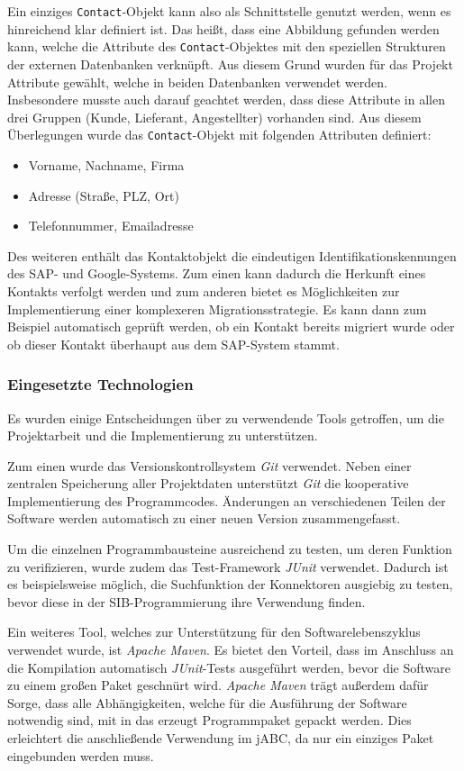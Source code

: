 Ein einziges \lstinline{Contact}-Objekt kann also als Schnittstelle genutzt werden, wenn es hinreichend klar definiert ist.
Das heißt, dass eine Abbildung gefunden werden kann, welche die Attribute des \lstinline{Contact}-Objektes mit den speziellen
 Strukturen der externen Datenbanken verknüpft.
Aus diesem Grund wurden für das Projekt Attribute gewählt, welche in beiden Datenbanken verwendet werden.
Insbesondere musste auch darauf geachtet werden, dass diese Attribute in allen drei Gruppen (Kunde, Lieferant,
 Angestellter) vorhanden sind.
Aus diesem Überlegungen wurde das \lstinline{Contact}-Objekt mit folgenden Attributen definiert:
\begin{itemize}
	\item Vorname, Nachname, Firma
	\item Adresse (Straße, PLZ, Ort)
	\item Telefonnummer, Emailadresse
\end{itemize}
Des weiteren enthält das Kontaktobjekt die eindeutigen Identifikationskennungen des SAP- und Google-Systems.
Zum einen kann dadurch die Herkunft eines Kontakts verfolgt werden und zum anderen bietet es Möglichkeiten
 zur Implementierung einer komplexeren Migrationsstrategie.
Es kann dann zum Beispiel automatisch geprüft werden, ob ein Kontakt bereits migriert wurde oder ob dieser
 Kontakt überhaupt aus dem SAP-System stammt.
	
\subsubsection{Eingesetzte Technologien}
Es wurden einige Entscheidungen über zu verwendende Tools getroffen, um die Projektarbeit und die
 Implementierung zu unterstützen.
 
Zum einen wurde das Versionskontrollsystem \emph{Git} verwendet.
Neben einer zentralen Speicherung aller Projektdaten unterstützt \emph{Git} die kooperative Implementierung des Programmcodes.
Änderungen an verschiedenen Teilen der Software werden automatisch zu einer neuen Version zusammengefasst.

Um die einzelnen Programmbausteine ausreichend zu testen, um deren Funktion zu verifizieren, wurde zudem das
 Test-Framework \emph{JUnit} verwendet. Dadurch ist es beispielsweise möglich, die Suchfunktion der Konnektoren ausgiebig
 zu testen, bevor diese in der SIB-Programmierung ihre Verwendung finden.

Ein weiteres Tool, welches zur Unterstützung für den Softwarelebenszyklus verwendet wurde, ist \emph{Apache Maven}.
Es bietet den Vorteil, dass im Anschluss an die Kompilation automatisch \emph{JUnit}-Tests ausgeführt werden, bevor
 die Software zu einem großen Paket geschnürt wird.
 \emph{Apache Maven} trägt außerdem dafür Sorge, dass alle Abhängigkeiten, welche für die Ausführung der Software
  notwendig sind, mit in das erzeugt Programmpaket gepackt werden.
 Dies erleichtert die anschließende Verwendung im jABC, da nur ein einziges Paket eingebunden werden muss.

